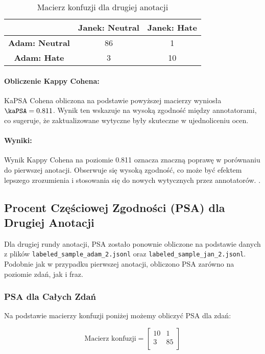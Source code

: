 \documentclass[12pt]{article}
\begin{document}
\begin{table}[h!]
\centering
\begin{tabular}{|c|c|c|}
\hline
           & \textbf{Janek: Neutral} & \textbf{Janek: Hate} \\ \hline
\textbf{Adam: Neutral} & 86                      & 1                   \\ \hline
\textbf{Adam: Hate}    & 3                       & 10                  \\ \hline
\end{tabular}
\caption{Macierz konfuzji dla drugiej anotacji}
\end{table}

\paragraph{Obliczenie Kappy Cohena:}
KaPSA Cohena obliczona na podstawie powyższej macierzy wyniosła \( \kaPSA = 0.811 \). Wynik ten wskazuje na wysoką zgodność między annotatorami, co sugeruje, że zaktualizowane wytyczne były skuteczne w ujednoliceniu ocen.

\paragraph{Wyniki:}
Wynik Kappy Cohena na poziomie 0.811 oznacza znaczną poprawę w porównaniu do pierwszej anotacji. Obserwuje się wysoką zgodność, co może być efektem lepszego zrozumienia i stosowania się do nowych wytycznych przez annotatorów. .

\subsection{Procent Częściowej Zgodności (PSA) dla Drugiej Anotacji}

Dla drugiej rundy anotacji, PSA zostało ponownie obliczone na podstawie danych z plików \texttt{labeled\_sample\_adam\_2.jsonl} oraz \texttt{labeled\_sample\_jan\_2.jsonl}. Podobnie jak w przypadku pierwszej anotacji, obliczono PSA zarówno na poziomie zdań, jak i fraz.

\subsubsection{PSA dla Całych Zdań}

Na podstawie macierzy konfuzji poniżej możemy obliczyć PSA dla zdań:

\[
\text{Macierz konfuzji} =
\begin{bmatrix}
10 & 1 \\
3 & 85 \\
\end{bmatrix}
\]
\end{document}
